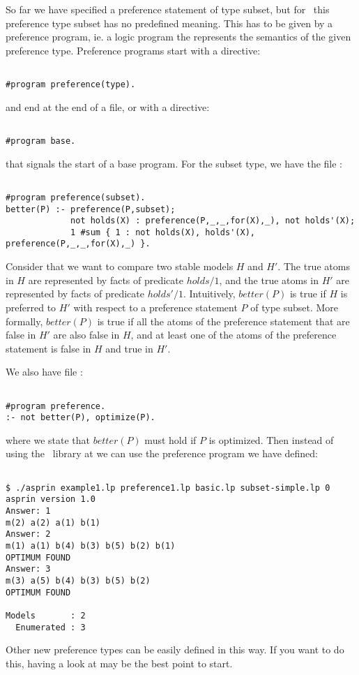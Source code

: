 So far we have specified a preference statement of type subset, 
but for \asprin\ this preference type subset has no predefined meaning. 
This has to be given by a preference program,  ie. a logic program the represents the semantics of the given preference type. 
Preference programs start with a directive: 
\begin{verbatim}

#program preference(type).
\end{verbatim}
and end at the end of a file, or with a directive:  
\begin{verbatim}

#program base.
\end{verbatim}
that signals the start of a base program. For the subset type, we have the file : 
\begin{verbatim}

#program preference(subset).
better(P) :- preference(P,subset);
             not holds(X) : preference(P,_,_,for(X),_), not holds'(X);
             1 #sum { 1 : not holds(X), holds'(X), preference(P,_,_,for(X),_) }.
\end{verbatim}
Consider that we want to compare two stable models $H$ and $H'$. 
The true atoms in $H$ are represented by facts of predicate $holds/1$,  and the true atoms in $H'$ are represented by facts of predicate $holds'/1$. 
Intuitively, $better(P)$ is true if $H$ is preferred to $H'$ with respect to a preference statement $P$ of type subset. 
More formally, $better(P)$ is true if all the atoms of the preference statement that are false in $H'$ are also false in $H$,  
and at least one of the atoms of the preference statement is false in $H$ and true in $H'$. 

We also have file : 
\begin{verbatim}

#program preference.
:- not better(P), optimize(P).
\end{verbatim}
where we state that $better(P)$ must hold if $P$ is optimized. 
Then instead of using the \asprin\ library at  we can use the preference program we have defined: 
\begin{verbatim}

$ ./asprin example1.lp preference1.lp basic.lp subset-simple.lp 0
asprin version 1.0
Answer: 1
m(2) a(2) a(1) b(1)
Answer: 2
m(1) a(1) b(4) b(3) b(5) b(2) b(1)
OPTIMUM FOUND
Answer: 3
m(3) a(5) b(4) b(3) b(5) b(2)
OPTIMUM FOUND

Models       : 2
  Enumerated : 3

\end{verbatim}
Other new preference types can be easily defined in this way.  
If you want to do this, having a look at  may be the best point to start. 

\iffalse
\fi

